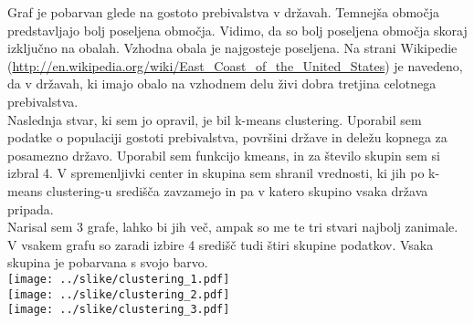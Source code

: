\documentclass[11pt,a4paper]{article}
\begin{document}
Graf je pobarvan glede na gostoto prebivalstva v državah. Temnejša območja predstavljajo bolj poseljena območja. Vidimo, da so bolj poseljena območja skoraj izključno na obalah. Vzhodna obala je najgosteje poseljena. Na strani Wikipedie (\url{http://en.wikipedia.org/wiki/East_Coast_of_the_United_States}) je navedeno, da v državah, ki imajo obalo na vzhodnem delu živi dobra tretjina celotnega prebivalstva.\\

Naslednja stvar, ki sem jo opravil, je bil k-means clustering. Uporabil sem podatke o populaciji gostoti prebivalstva, površini države in deležu kopnega za posamezno državo. Uporabil sem funkcijo kmeans, in za število skupin sem si izbral 4.
V spremenljivki center in skupina sem shranil vrednosti, ki jih po k-means clustering-u središča zavzamejo in pa v katero skupino vsaka država pripada.\\

Narisal sem 3 grafe, lahko bi jih več, ampak so me te tri stvari najbolj zanimale. V vsakem grafu so zaradi izbire 4 središč tudi štiri skupine podatkov. Vsaka skupina je pobarvana s svojo barvo.\\

\texttt{[image: ../slike/clustering\_1.pdf]}\\

\texttt{[image: ../slike/clustering\_2.pdf]}\\

\texttt{[image: ../slike/clustering\_3.pdf]}\\
\end{document}
